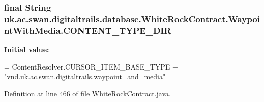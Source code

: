 \hypertarget{classuk_1_1ac_1_1swan_1_1digitaltrails_1_1database_1_1_white_rock_contract_1_1_waypoint_with_media_ade4b0d3e7a36643dc9ac9071430ce8e6}{
\subsubsection[{C\+O\+N\+T\+E\+N\+T\+\_\+\+T\+Y\+P\+E\+\_\+\+D\+I\+R}]{\setlength{\rightskip}{0pt plus 5cm}final String uk.\+ac.\+swan.\+digitaltrails.\+database.\+White\+Rock\+Contract.\+Waypoint\+With\+Media.\+C\+O\+N\+T\+E\+N\+T\+\_\+\+T\+Y\+P\+E\+\_\+\+D\+I\+R\hspace{0.3cm}{\ttfamily [static]}}}\label{classuk_1_1ac_1_1swan_1_1digitaltrails_1_1database_1_1_white_rock_contract_1_1_waypoint_with_media_ade4b0d3e7a36643dc9ac9071430ce8e6}
{\bfseries Initial value\+:}
\begin{DoxyCode}
= ContentResolver.CURSOR\_ITEM\_BASE\_TYPE +
                \textcolor{stringliteral}{"vnd.uk.ac.swan.digitaltrails.waypoint\_and\_media"}
\end{DoxyCode}


Definition at line 466 of file White\+Rock\+Contract.\+java.

